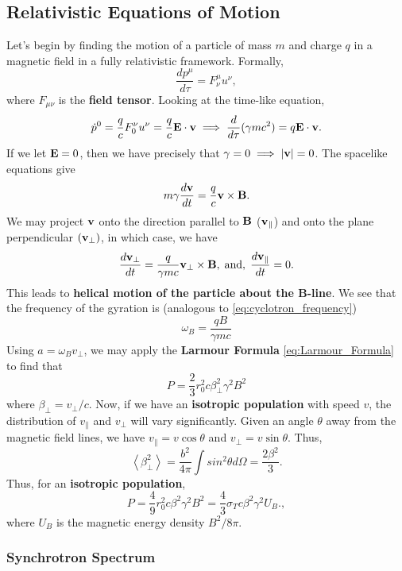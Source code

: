 \subsection{Relativistic Equations of Motion}
Let's begin by finding the motion of a particle of mass $m$ and charge $q$ in a magnetic field in a fully relativistic framework. Formally,
\[
\frac{dp^\mu}{d\tau} = F^\mu_{\nu} u^\nu,
\]
where $F_{\mu\nu}$ is the \textbf{field tensor}. Looking at the time-like equation,
\[
\dot{p}^0 = \frac{q}{c} F_0^\nu u^\nu = \frac{q}{c} {\bf E} \cdot {\bf v} \implies \frac{d}{d\tau}(\gamma mc^2) = q{\bf E} \cdot {\bf v}.
\]
If we let ${\bf E} = 0$, then we have precisely that $\gamma = 0 \implies |{\bf v}| = 0$. The spacelike equations give
\[
m\gamma \frac{d{\bf v}}{dt} = \frac{q}{c} {\bf v} \times {\bf B}.
\]
We may project ${\bf v}$ onto the direction parallel to ${\bf B}$ (${\bf v}_\parallel$) and onto the plane perpendicular $({\bf v}_\perp)$, in which case, we have
\[
\frac{d{\bf v}_\perp}{dt} = \frac{q}{\gamma mc} {\bf v}_\perp \times {\bf B},\;\text{and},\; \frac{d{\bf v}_\parallel}{dt} = 0.
\]
This leads to \textbf{helical motion of the particle about the B-line}. We see that the frequency of the gyration is (analogous to \eqref{eq:cyclotron_frequency})
\begin{equation}
\label{eq:synchrotron_frequency}
\boxed{
    \omega_B = \frac{qB}{\gamma m c}
    }
\end{equation}
Using $a = \omega_B v_\perp$, we may apply the \textbf{Larmour Formula} \eqref{eq:Larmour_Formula} to find that
\begin{equation}
    \label{eq:synchrotron_total_power}
    \boxed{
    P = \frac{2}{3} r_0^2 c \beta^2_\perp \gamma^2 B^2
    }
\end{equation}
where $\beta_\perp = v_\perp/c$. Now, if we have an \textbf{isotropic population} with speed $v$, the distribution of $v_\parallel$ and $v_\perp$ will vary significantly. Given an angle $\theta$ away from the magnetic field lines, we have $v_\parallel = v\cos \theta$ and $v_\perp = v\sin \theta$. Thus,
\[
\left<\beta_\perp^2\right> = \frac{b^2}{4\pi} \int sin^2\theta d\Omega = \frac{2\beta^2}{3}.
\]
Thus, for an \textbf{isotropic population},
\[
P = \frac{4}{9} r_0^2 c \beta^2 \gamma^2 B^2 = \frac{4}{3} \sigma_T c \beta^2 \gamma^2 U_B.,
\]
where $U_B$ is the magnetic energy density $B^2/8\pi$.

\subsubsection{Synchrotron Spectrum}

